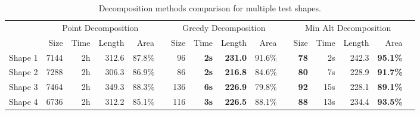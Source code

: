 \documentclass[../main.tex]{subfiles}
\begin{document}
%


\begin{table}
	\centering
	\begin{tabular}{@{} l rrrr l rrrr l rrrr l@{}}
		\toprule
		& \multicolumn{4}{c}{Point Decomposition} & \phantom{a} & \multicolumn{4}{c}{Greedy Decomposition} & \phantom{a} & \multicolumn{4}{c}{Min Alt Decomposition}\\
		\cmidrule{2-5} 		\cmidrule{7-10}  \cmidrule{12-15} 
		& Size & Time & Length & Area & & Size & Time & Length & Area & & Size & Time & Length & Area \\
		\midrule
		Shape 1 & 7144 & 2h & 312.6 & 87.8\% & & 96 & \bf{2s} & \bf{231.0} & 91.6\% & & \bf{78} & 2s & 242.3 & \bf{95.1\%}\\
		Shape 2 & 7288  & 2h & 306.3 & 86.9\% & & 86 & \bf{2s} & \bf{216.8} & 84.6\% & & \bf{80} & 7s & 228.9 & \bf{91.7\%} \\
		Shape 3 & 7464 & 2h & 349.3 & 88.3\% & & 136 & \bf{6s} & \bf{226.9} & 79.8\% & & \bf{92} & 15s & 228.1 & \bf{89.1\%} \\
		Shape 4 & 6736 & 2h & 312.2 & 85.1\% & & 116 & \bf{3s} & \bf{226.5} & 88.1\% & & \bf{88} & 13s & 234.4 & \bf{93.5\%}\\

		\bottomrule

	\end{tabular}
	\caption{Decomposition methods comparison for multiple test shapes.}
	\label{table:performance}
\end{table}
\end{document}

